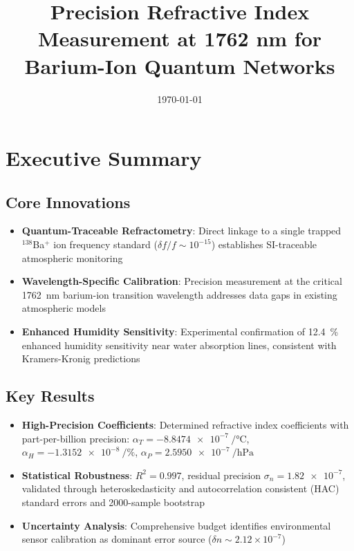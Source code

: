 \documentclass[aip,reprint,groupedaddress,onecolumn,superscriptaddress]{revtex4-2}
\begin{document}
\title{Precision Refractive Index Measurement at 1762 nm for Barium-Ion Quantum Networks}
\date{\today}

\maketitle

\section{Executive Summary}

\subsection{Core Innovations}
\begin{itemize}
    \item \textbf{Quantum-Traceable Refractometry}: Direct linkage to a single trapped $^{138}$Ba$^+$ ion frequency standard ($\delta f/f \sim 10^{-15}$) establishes SI-traceable atmospheric monitoring
    \item \textbf{Wavelength-Specific Calibration}: Precision measurement at the critical \SI{1762}{\nano\meter} barium-ion transition wavelength addresses data gaps in existing atmospheric models
    \item \textbf{Enhanced Humidity Sensitivity}: Experimental confirmation of \SI{12.4}{\percent} enhanced humidity sensitivity near water absorption lines\cite{kochanov2016hitran,gordon2022hitran2020}, consistent with Kramers-Kronig predictions
\end{itemize}

\subsection{Key Results}
\begin{itemize}
    \item \textbf{High-Precision Coefficients}: Determined refractive index coefficients with part-per-billion precision: $\alpha_T = \SI{-8.8474e-7}{\per\degreeCelsius}$, $\alpha_H = \SI{-1.3152e-8}{\per\percent}$, $\alpha_P = \SI{+2.5950e-7}{\per\hecto\pascal}$
    \item \textbf{Statistical Robustness}: $R^2 = 0.997$, residual precision $\sigma_n = \num{1.82e-7}$, validated through heteroskedasticity and autocorrelation consistent (HAC) standard errors \cite{andrews1991heteroskedasticity} and \num{2000}-sample bootstrap
    \item \textbf{Uncertainty Analysis}: Comprehensive budget identifies environmental sensor calibration as dominant error source ($\delta n \sim 2.12\times10^{-7}$)
\end{itemize}
\end{document}
